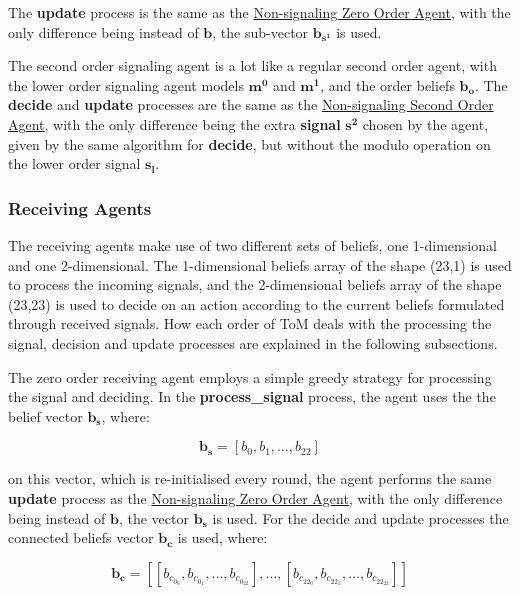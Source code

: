 The \textbf{update} process is the same as the \hyperref[eq:zero-order-update]{Non-signaling Zero Order Agent}, with the only difference being instead of $\mathbf{b}$, the sub-vector $\mathbf{b_{s^1}}$ is used.


The second order signaling agent is a lot like a regular second order agent, with the lower order signaling agent models $\mathbf{m^0}$ and $\mathbf{m^1}$, and the order beliefs $\mathbf{b_o}$. The \textbf{decide} and \textbf{update} processes are the same as the \hyperref[eq:second-order-decide]{Non-signaling Second Order Agent}, with the only difference being the extra \textbf{signal} $\mathbf{s^2}$ chosen by the agent, given by the same algorithm for \textbf{decide}, but without the modulo operation on the lower order signal $\mathbf{s_l}$.

\subsubsection{Receiving Agents}

The receiving agents make use of two different sets of beliefs, one 1-dimensional and one 2-dimensional. The 1-dimensional beliefs array of the shape (23,1) is used to process the incoming signals, and the 2-dimensional beliefs array of the shape (23,23) is used to decide on an action according to the current beliefs formulated through received signals. How each order of ToM deals with the processing the signal, decision and update processes are explained in the following subsections.


The zero order receiving agent employs a simple greedy strategy for processing the signal and deciding. In the \textbf{process\_signal} process, the agent uses the the belief vector $\mathbf{b_s}$, where:

\[
\mathbf{b_s} = [b_{0}, b_{1}, \ldots, b_{22}]
\]

on this vector, which is re-initialised every round, the agent performs the same \textbf{update} process as the \hyperref[eq:zero-order-update]{Non-signaling Zero Order Agent}, with the only difference being instead of $\mathbf{b}$, the vector $\mathbf{b_s}$ is used. For the decide and update processes the connected beliefs vector $\mathbf{b_c}$ is used, where:

\[
\mathbf{b_c} = [[b_{c_{0_{0}}}, b_{c_{0_{1}}}, \ldots, b_{c_{0_{22}}}], \ldots, [b_{c_{22_{0}}}, b_{c_{22_{1}}}, \ldots, b_{c_{22_{22}}}]]
\]

